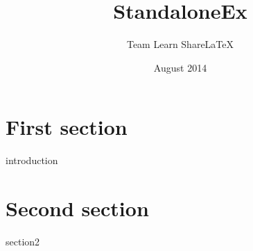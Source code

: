 \documentclass{article}
\title{StandaloneEx}
\author{Team Learn ShareLaTeX}
\date{August 2014}
\begin{document}
 
    \maketitle
 
    \section{First section}
    {introduction}
 
    \section{Second section}
    {section2}
 
\end{document}

